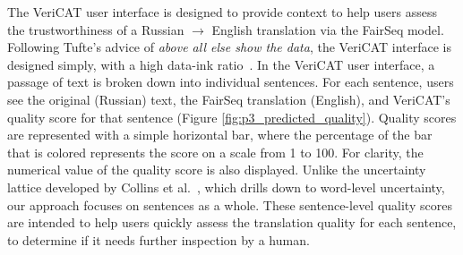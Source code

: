 The VeriCAT user interface is designed to provide context to help users assess the trustworthiness of a Russian $\rightarrow$ English translation via the FairSeq model.
Following Tufte's advice of \textit{above all else show the data}, the VeriCAT interface is designed simply, with a high data-ink ratio~\cite{tufte}.  
In the VeriCAT user interface, a passage of text is broken down into individual sentences. For each sentence, users see the original (Russian) text, the FairSeq translation (English), and VeriCAT’s quality score for that sentence (Figure \ref{fig:p3_predicted_quality}). Quality scores are represented with a simple horizontal bar, where the percentage of the bar that is colored represents the score on a scale from 1 to 100. For clarity, the numerical value of the quality score is also displayed. Unlike the uncertainty lattice developed by Collins et al.~\cite{collins2007lattices}, which drills down to word-level uncertainty, our approach focuses on sentences as a whole. These sentence-level quality scores are intended to help users quickly assess the translation quality for each sentence, to determine if it needs further inspection by a human. 






  


